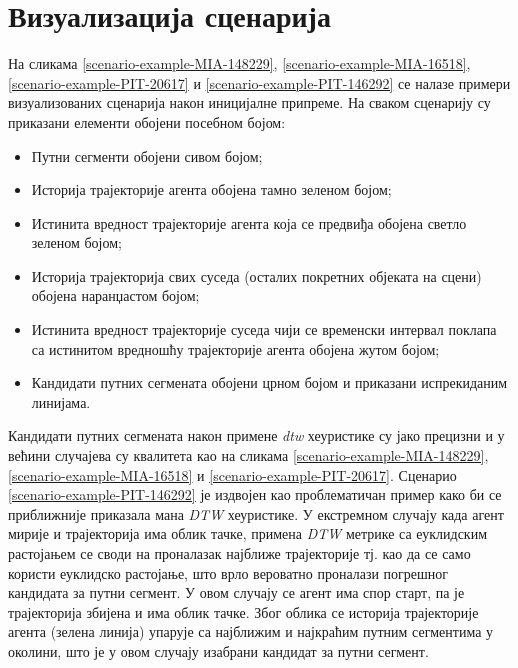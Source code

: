 \documentclass[11pt,oneside]{memoir}
\begin{document}
\section{Визуализација сценарија}

На сликама \ref{scenario-example-MIA-148229}, \ref{scenario-example-MIA-16518}, \ref{scenario-example-PIT-20617} и \ref{scenario-example-PIT-146292} 
се налазе примери визуализованих сценарија након иницијалне припреме. На сваком сценарију су приказани елементи обојени посебном бојом:
\begin{itemize}
  \item Путни сегменти обојени сивом бојом;
  \item Историја трајекторије агента обојена тамно зеленом бојом;
  \item Истинита вредност трајекторије агента која се предвиђа обојена светло зеленом бојом;
  \item Историја трајекторија свих суседа (осталих покретних објеката на сцени) обојена наранџастом бојом;
  \item Истинита вредност трајекторије суседа чији се временски интервал поклапа са истинитом вредношћу трајекторије агента обојена жутом бојом;
  \item Кандидати путних сегмената обојени црном бојом и приказани испрекиданим линијама.
\end{itemize}

Кандидати путних сегмената након примене \textit{dtw} хеуристике су јако прецизни и у већини случајева су квалитета као на
сликама \ref{scenario-example-MIA-148229}, \ref{scenario-example-MIA-16518} и \ref{scenario-example-PIT-20617}. Сценарио 
\ref{scenario-example-PIT-146292} је издвојен као проблематичан пример како би се приближније приказала мана \textit{DTW} хеуристике.
У екстремном случају када агент мирије и трајекторија има облик тачке, примена \textit{DTW} метрике са еуклидским растојањем се своди на
проналазак најближе трајекторије тј. као да се само користи еуклидско растојање, што врло вероватно проналази погрешног кандидата за путни сегмент.
У овом случају се агент има спор старт, па је трајекторија збијена и има облик тачке. Због облика се историја трајекторије агента (зелена линија)
упарује са најближим и најкраћим путним сегментима у околини, што је у овом случају изабрани кандидат за путни сегмент.
\end{document}

